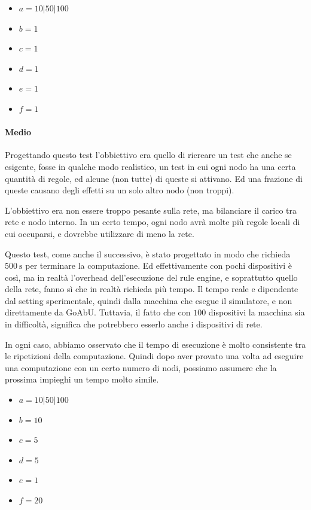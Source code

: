 \documentclass[12pt, a4paper]{article}
\begin{document}
\begin{itemize}
    \item $a=10|50|100$
    \item $b=1$
    \item $c=1$
    \item $d=1$
    \item $e=1$
    \item $f=1$
\end{itemize}

\paragraph{Medio}

Progettando questo test l'obbiettivo era quello di ricreare un test che anche se esigente, fosse in qualche modo realistico, un test in cui ogni nodo ha una certa quantità di regole, ed alcune (non tutte) di queste si attivano. Ed una frazione di queste causano degli effetti su un solo altro nodo (non troppi).

L'obbiettivo era non essere troppo pesante sulla rete, ma bilanciare il carico tra rete e nodo interno. In un certo tempo, ogni nodo avrà molte più regole locali di cui occuparsi, e dovrebbe utilizzare di meno la rete.

Questo test, come anche il successivo, è stato progettato in modo che richieda $\qty{500}{\second}$ per terminare la computazione. Ed effettivamente con pochi dispositivi è così, ma in realtà l'overhead dell'esecuzione del rule engine, e soprattutto quello della rete, fanno sì che in realtà richieda più tempo.
Il tempo reale e dipendente dal setting sperimentale, quindi dalla macchina che esegue il simulatore, e non direttamente da GoAbU. Tuttavia, il fatto che con $100$ dispositivi la macchina sia in difficoltà, significa che potrebbero esserlo anche i dispositivi di rete.

In ogni caso, abbiamo osservato che il tempo di esecuzione è molto consistente tra le ripetizioni della computazione. Quindi dopo aver provato una volta ad eseguire una computazione con un certo numero di nodi, possiamo assumere che la prossima impieghi un tempo molto simile.

\begin{itemize}
    \item $a=10|50|100$
    \item $b=10$
    \item $c=5$
    \item $d=5$
    \item $e=1$
    \item $f=20$
\end{itemize}
\end{document}

